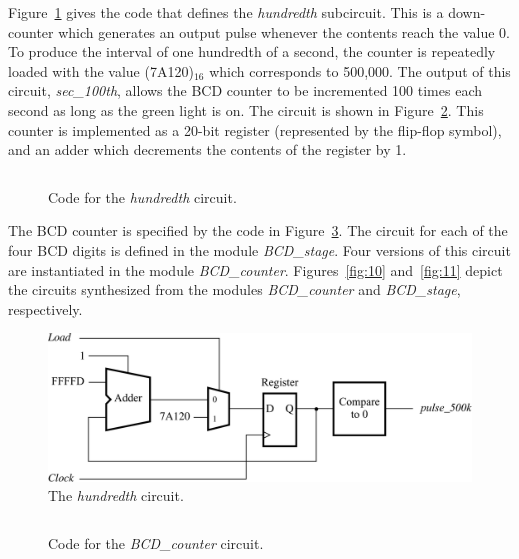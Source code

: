 \documentclass[11pt, twoside, pdftex]{article}
\begin{document}
Figure~\ref{fig:7} gives the code that defines the {\it hundredth} subcircuit. This is a 
down-counter which generates an output pulse
whenever the contents reach the value 0. To produce the interval of one hundredth
of a second, the counter is repeatedly loaded with the value (7A120)$_{16}$ which
corresponds to 500,000. The output of this circuit, {\it sec\_100th}, allows
the BCD counter to be incremented 100 times each second
as long as the green light is on. The circuit is shown in Figure~\ref{fig:8}. This
counter is implemented as a 20-bit register (represented by the flip-flop symbol),
and an adder which decrements the contents of the register by 1.

\begin{figure}[H]
\begin{center}
\begin{tabular}{c}

\end{tabular}
\end{center}
	\caption{Code for the {\it hundredth} circuit.}
	\label{fig:7}
\end{figure}

The BCD counter is specified by the code in Figure~\ref{fig:9}.
The circuit for each of the four BCD digits is defined in the module {\it BCD\_stage}.
Four versions of this circuit are instantiated in the module {\it BCD\_counter}.
Figures~\ref{fig:10} and~\ref{fig:11} depict the circuits synthesized from the modules {\it BCD\_counter}
and {\it BCD\_stage}, respectively.
 
\begin{figure}[H]
   \begin{center}
      \includegraphics[scale=0.8]{figures/figure8.png}
   \caption{The {\it hundredth} circuit.} 
	 \label{fig:8}
	 \end{center}
\end{figure}

\begin{figure}[H]
\begin{center} %
\begin{tabular}{c}

\end{tabular}
\end{center}
	\caption{Code for the {\it BCD\_counter} circuit.}
	\label{fig:9}
\end{figure}
\end{document}
